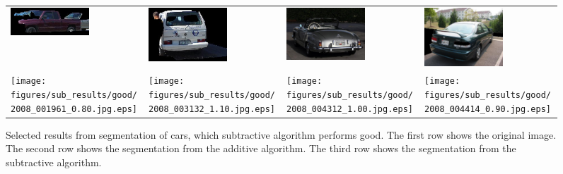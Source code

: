 \documentclass[10pt,twocolumn,letterpaper]{article}
\begin{document}
\begin{figure}[p]
\begin{tabular}{ p{3cm} p{3cm} p{3cm} p{3cm} }
\includegraphics[width=2.95cm]{figures/add_res/car/bad/2008_001961.jpg_1_bad.jpg.eps} &
\includegraphics[width=2.95cm]{figures/add_res/car/bad/2008_003132.jpg_1_bad.jpg.eps} &
\includegraphics[width=2.95cm]{figures/add_res/car/bad/2008_004312.jpg_1_bad.jpg.eps} &
\includegraphics[width=2.95cm]{figures/add_res/car/bad/2008_004414.jpg_1_bad.jpg.eps} \\

\texttt{[image: figures/sub\_results/good/2008\_001961\_0.80.jpg.eps]} &
\texttt{[image: figures/sub\_results/good/2008\_003132\_1.10.jpg.eps]} &
\texttt{[image: figures/sub\_results/good/2008\_004312\_1.00.jpg.eps]} &
\texttt{[image: figures/sub\_results/good/2008\_004414\_0.90.jpg.eps]} \\

\end{tabular}
\caption{Selected results from segmentation of cars, which subtractive algorithm performs good. 
 The first row shows the original image.  The second row shows
the segmentation from the additive algorithm.  The third row shows
the segmentation from the subtractive algorithm.}
\label{fig:car_bad_results}
\end{figure}
\end{document}
